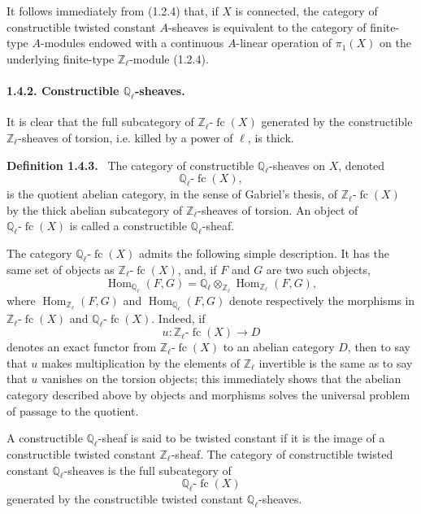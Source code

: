 \documentclass[11pt]{article}
\newenvironment{statement}[1]{\par\medskip\noindent\textbf{#1.}\ }{\par\medskip}
\DeclareMathOperator{\Hom}{Hom}
\providecommand{\Hom}{\operatorname{Hom}}
\providecommand{\fc}{\operatorname{fc}}
\providecommand{\Hom}{\operatorname{Hom}}
\begin{document}
It follows immediately from (1.2.4) that, if \(X\) is connected, the category of constructible twisted constant \(A\)-sheaves is equivalent to the category of finite-type \(A\)-modules endowed with a continuous \(A\)-linear operation of \(\pi_1(X)\) on the underlying finite-type \(\mathbb Z_\ell\)-module (1.2.4).

\paragraph{1.4.2. Constructible \(\mathbb Q_\ell\)-sheaves.}
It is clear that the full subcategory of \(\mathbb Z_\ell\text{-}\fc(X)\) generated by the constructible \(\mathbb Z_\ell\)-sheaves of torsion, i.e. killed by a power of \(\ell\), is thick.

\begin{statement}{Definition 1.4.3}
The category of constructible \(\mathbb Q_\ell\)-sheaves on \(X\), denoted
\[
\mathbb Q_\ell\text{-}\fc(X),
\]
is the quotient abelian category, in the sense of Gabriel's thesis, of \(\mathbb Z_\ell\text{-}\fc(X)\) by the thick abelian subcategory of \(\mathbb Z_\ell\)-sheaves of torsion. An object of \(\mathbb Q_\ell\text{-}\fc(X)\) is called a constructible \(\mathbb Q_\ell\)-sheaf.
\end{statement}

The category \(\mathbb Q_\ell\text{-}\fc(X)\) admits the following simple description. It has the same set of objects as \(\mathbb Z_\ell\text{-}\fc(X)\), and, if \(F\) and \(G\) are two such objects,
\[
\Hom_{\mathbb Q_\ell}(F,G)
=\mathbb Q_\ell\otimes_{\mathbb Z_\ell}\Hom_{\mathbb Z_\ell}(F,G),
\]
where \(\Hom_{\mathbb Z_\ell}(F,G)\) and \(\Hom_{\mathbb Q_\ell}(F,G)\) denote respectively the morphisms in \(\mathbb Z_\ell\text{-}\fc(X)\) and \(\mathbb Q_\ell\text{-}\fc(X)\). Indeed, if
\[
u:\mathbb Z_\ell\text{-}\fc(X)\longrightarrow D
\]
denotes an exact functor from \(\mathbb Z_\ell\text{-}\fc(X)\) to an abelian category \(D\), then to say that \(u\) makes multiplication by the elements of \(\mathbb Z_\ell\) invertible is the same as to say that \(u\) vanishes on the torsion objects; this immediately shows that the abelian category described above by objects and morphisms solves the universal problem of passage to the quotient.

A constructible \(\mathbb Q_\ell\)-sheaf is said to be twisted constant if it is the image of a constructible twisted constant \(\mathbb Z_\ell\)-sheaf. The category of constructible twisted constant \(\mathbb Q_\ell\)-sheaves is the full subcategory of
\[
\mathbb Q_\ell\text{-}\fc(X)
\]
generated by the constructible twisted constant \(\mathbb Q_\ell\)-sheaves.
\end{document}
